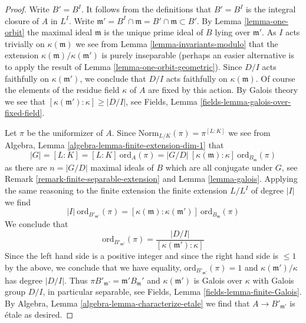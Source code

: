 \documentclass[10pt,a4paper]{amsart}
\theoremstyle{plain}
\theoremstyle{definition}
\theoremstyle{remark}
\numberwithin{equation}{subsection}
\begin{document}
\begin{proof}
Write $B' = B^I$. It follows from the definitions that $B' = B^I$
is the integral closure of $A$ in $L^I$. Write
$\mathfrak m' = B^I \cap \mathfrak m = B' \cap \mathfrak m \subset B'$.
By Lemma \ref{lemma-one-orbit} the maximal ideal $\mathfrak m$ is the
unique prime ideal of $B$ lying over $\mathfrak m'$.
As $I$ acts trivially on $\kappa(\mathfrak m)$ we see from
Lemma \ref{lemma-invariants-modulo} that the extension
$\kappa(\mathfrak m)/\kappa(\mathfrak m')$ is purely inseparable
(perhaps an easier alternative is to apply the result of
Lemma \ref{lemma-one-orbit-geometric}).
Since $D/I$ acts faithfully on $\kappa(\mathfrak m')$,
we conclude that $D/I$ acts faithfully on $\kappa(\mathfrak m)$.
Of course the elements of the residue field $\kappa$ of $A$
are fixed by this action.
By Galois theory we see that $[\kappa(\mathfrak m') : \kappa] \geq |D/I|$,
see Fields, Lemma \ref{fields-lemma-galois-over-fixed-field}.

\medskip\noindent
Let $\pi$ be the uniformizer of $A$. Since
$\text{Norm}_{L/K}(\pi) = \pi^{[L : K]}$ we see from
Algebra, Lemma \ref{algebra-lemma-finite-extension-dim-1}
that
$$
|G| = [L : K] = [L : K]\ \text{ord}_A(\pi) =
|G/D|\ [\kappa(\mathfrak m) : \kappa]\ \text{ord}_{B_\mathfrak m}(\pi)
$$
as there are $n = |G/D|$ maximal ideals of $B$ which are all
conjugate under $G$, see
Remark \ref{remark-finite-separable-extension} and
Lemma \ref{lemma-galois}.
Applying the same reasoning to the finite extension
the finite extension $L/L^I$ of degree $|I|$ we find
$$
|I|\ \text{ord}_{B'_{\mathfrak m'}}(\pi) =
[\kappa(\mathfrak m) : \kappa(\mathfrak m')]\ \text{ord}_{B_\mathfrak m}(\pi)
$$
We conclude that
$$
\text{ord}_{B'_{\mathfrak m'}}(\pi) =
\frac{|D/I|}{[\kappa(\mathfrak m') : \kappa]}
$$
Since the left hand side is a positive integer and since the right hand
side is $\leq 1$ by the above, we conclude that we have equality,
$\text{ord}_{B'_{\mathfrak m'}}(\pi) = 1$ and
$\kappa(\mathfrak m')/\kappa$ has degree $|D/I|$.
Thus $\pi B'_{\mathfrak m'} = \mathfrak m' B_\mathfrak m'$ and
$\kappa(\mathfrak m')$ is Galois over $\kappa$ with
Galois group $D/I$, in particular separable, see
Fields, Lemma \ref{fields-lemma-finite-Galois}.
By Algebra, Lemma \ref{algebra-lemma-characterize-etale}
we find that $A \to B'_{\mathfrak m'}$ is \'etale
as desired.
\end{proof}
\end{document}
